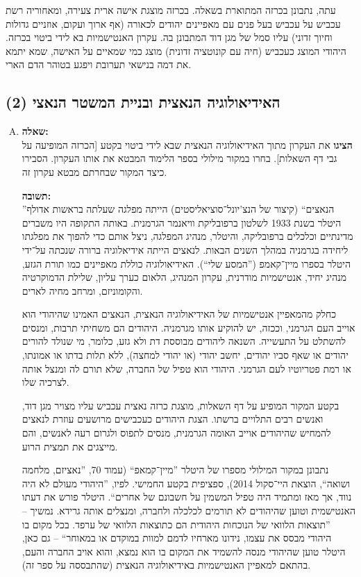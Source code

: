 \documentclass[a4paper]{article}
\newcommand\hl[1]   {#1}
\begin{document}
	עתה, נתבונן בכרזה המתוארת בשאלה. בכרזה מוצגת אישה ארית צעירה, ומאחוריה רשת עכביש על עכביש בעל פנים עם מאפיינים יהודים לכאורה (אף ארוך ועקום, אוזניים גדולות וחיוך זדוני) עליו סמל של מגן דוד המתבונן בה. עקרון האנטישמיות בא לידי ביטוי בכרזה. היהודי המוצג כעכביש (חיה עם קונוטציה זדונית) מוצג כמי שמאיים על האישה, שמא יתמא את דמה בנישאי תערובת ויפגע בטוהר הדם הארי. 
	
	\subsection{האידיאולוגיה הנאצית ובניית המשטר הנאצי (2)}
		\begin{enumerate}[A.]
			\item \textbf{שאלה: }\\
			\textbf{הציגו} את העקרון מתוך האידיאולוגיה הנאצית שבא לידי ביטוי בקטע [הכרזה המופיעה על גבי דף השאלות]. בחרו במקור מילולי בספר הלימוד המבטא את אותו העקרון. הסבירו כיצד המקור שבחרתם מבטא עקרון זה. 
			
			\textbf{תשובה: }\\
			''\hl{הנאצים}`` (קיצור של הנצ'יונל־סוציאליסטים) הייתה מפלגה שעלתה בראשות \hl{אדולף היטלר} בשנת 1933 לשלטון ברפובליקת וויאנמר הגרמנית. באותה התקופה היו משברים מדינתיים וכלכלים ברפובליקה, והיטלר, מנהיג המפלגה, ניצל אותם כדי להפוך את מפלגתו ליחידה בגרמניה במהלך השנים הבאות. לנאצים הייתה אידיאלוגיה ברורה שנכתה על־ידי היטלר בספרו מיין־קאמפ (''המסע שלי``). האידיאולוגיה כוללת מאפיינים כמו תורת הגזע, מנהיג יחיד, אנטישמיות מודרנית, עקרון המנהיג, הלאום כערך עליון, שלילת הדמוקרטיה והקומוניזם, ומרחב מחיה לארים. 
			
			כחלק מהמאפיין \hl{אנטישמיות} של האידיאולוגיה הנאצית, הנאצים האמינו שהיהודי הוא אוייב העם הגרמני, וככזה, יש להוקיע אותו מגרמניה. היהודים הם משחיתי תרבות, ומנסים להשתלט על התעשייה. השנאה ליהודים מבוססת דת ולא גזע, כלומר, מי שנולד להורים יהודים או שאף סביו יהודים, יחשב יהודי (או יהודי למחצה), ללא תלות בדתו או אמונתו, או רמת פטריוטיו לעם הגרמני. היהודי הוא טפיל של החברה, שלא תורם לה ומנצל אותה לצרכיה שלו. 
			
			בקטע המקור המופיע על דף השאלות, מוצגת כרזה נאצית עכביש עליו מצויר מגן דוד, ואנשים רבים התלויים ברשתו. הצגת היהודים כעכבישים מרושעים עוזרת לנאצים להמחיש שהיהודים אוייב האומה הגרמנית, מנסים לתפוס ולגרום רעה לאנשים, והם מייצגים את תמצית הרוע. 
			
			נתבונן במקור המילולי מספרו של היטלר ''מיין־קמאפ`` (עמוד 70, ''נאציזם, מלחמה ושואה``, הוצאת היי־סקול 2014), ספציפית בקטע החמישי. לפיו, ''היהודי מעולם לא היה נווד, אך מאז ומתמיד היה טפיל המשמין על חשבונם של אחרים``. היטלר פורש את דעתו האנטישמית וטוען שהיהודים לא תורמים לכלכלה ולחברה, ומנצלים אותה גרידא. נמשיך – ''תוצאות הלוואי של הנוכחות היהודית הם כתוצאות הלוואי של ערפד. בכל מקום בו היהודי מבסס את עצמו, נידונו מארחיו לדמם למוות במוקדם או במאוחר`` – גם כאן, היטלר טוען שהיהודי מנסה להשמיד את המקום בו הוא נמצא, והוא אויב החברה והעם, בהתאם למאפיין האנטישמיות באידיאולוגיה הנאצית (שהתבססה על ספר זה). 
			

\end{enumerate}
\end{document}
